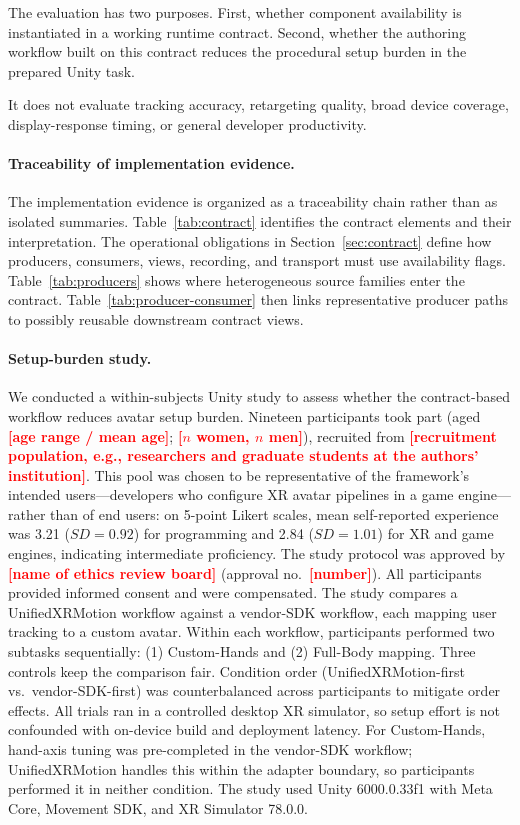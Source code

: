 \documentclass[runningheads]{llncs}
\newcommand{\todofill}[1]{\textcolor{red}{\textbf{[#1]}}}
\begin{document}
The evaluation has two purposes.
	First, whether component availability is instantiated in a working runtime contract.
	Second, whether the authoring workflow built on this contract reduces the procedural setup burden in the prepared Unity task.

It does not evaluate tracking accuracy, retargeting quality, broad device coverage, display-response timing, or general developer productivity.

\paragraph{Traceability of implementation evidence.}
	The implementation evidence is organized as a traceability chain rather than as isolated summaries.
	Table~\ref{tab:contract}  identifies the contract elements and their interpretation.
	The operational obligations in Section~\ref{sec:contract} define how producers, consumers, views, recording, and transport must use availability flags.
	Table~\ref{tab:producers} shows where heterogeneous source families enter the contract.
	Table~\ref{tab:producer-consumer} then links representative producer paths to possibly reusable downstream contract views.

\paragraph{Setup-burden study.}

	We conducted a within-subjects Unity study to assess whether the contract-based workflow reduces avatar setup burden.
	Nineteen participants took part (aged \todofill{age range / mean age}; \todofill{$n$ women, $n$ men}), recruited from \todofill{recruitment population, e.g., researchers and graduate students at the authors' institution}.
	This pool was chosen to be representative of the framework's intended users---developers who configure XR avatar pipelines in a game engine---rather than of end users: on 5-point Likert scales, mean self-reported experience was 3.21 ($SD=0.92$) for programming and 2.84 ($SD=1.01$) for XR and game engines, indicating intermediate proficiency.
	The study protocol was approved by \todofill{name of ethics review board} (approval no.~\todofill{number}).
	All participants provided informed consent and were compensated.
	The study compares a UnifiedXRMotion workflow against a vendor-SDK workflow, each mapping user tracking to a custom avatar.
	Within each workflow, participants performed two subtasks sequentially: (1) Custom-Hands and (2) Full-Body mapping.
	Three controls keep the comparison fair.
	Condition order (UnifiedXRMotion-first vs.\ vendor-SDK-first) was counterbalanced across participants to mitigate order effects.
	All trials ran in a controlled desktop XR simulator, so setup effort is not confounded with on-device build and deployment latency.
	For Custom-Hands, hand-axis tuning was pre-completed in the vendor-SDK workflow; UnifiedXRMotion handles this within the adapter boundary, so participants performed it in neither condition.
	The study used Unity 6000.0.33f1 with Meta Core, Movement SDK, and XR Simulator 78.0.0.
\end{document}
